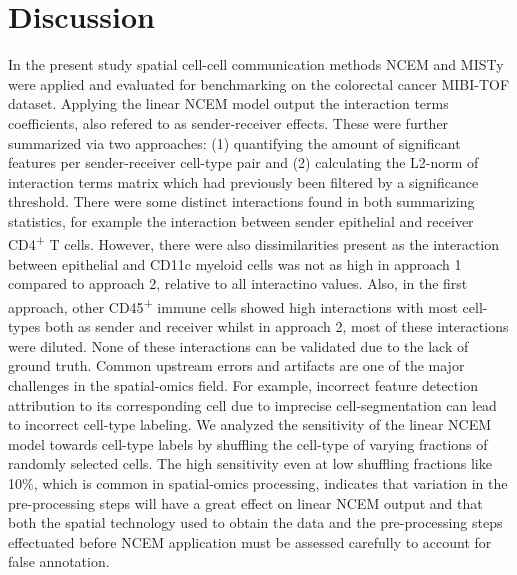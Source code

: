 \chapter{Discussion}
	


In the present study spatial cell-cell communication methods NCEM and MISTy were applied and evaluated for benchmarking on the \cite{Hartmann-2021} colorectal cancer MIBI-TOF dataset. Applying the linear NCEM model output the interaction terms coefficients, also refered to as sender-receiver effects. These were further summarized via two approaches: (1) quantifying the amount of significant features per sender-receiver cell-type pair and (2) calculating the L2-norm of interaction terms matrix which had previously been filtered by a significance threshold. There were some distinct interactions found in both summarizing statistics, for example the interaction between sender epithelial and receiver CD4\textsuperscript{+} T cells. However, there were also dissimilarities present as the interaction between epithelial and CD11c myeloid cells was not as high in approach 1 compared to approach 2, relative to all interactino values. Also, in the first approach, other CD45\textsuperscript{+} immune cells showed high interactions with most cell-types both as sender and receiver whilst in approach 2, most of these interactions were diluted. None of these interactions can be validated due to the lack of ground truth. Common upstream errors and artifacts are one of the major challenges in the spatial-omics field. For example, incorrect feature detection attribution to its corresponding cell due to imprecise cell-segmentation can lead to incorrect cell-type labeling. We analyzed the sensitivity of the linear NCEM model towards cell-type labels by shuffling the cell-type of varying fractions of randomly selected cells. The high sensitivity even at low shuffling fractions like 10\%, which is common in spatial-omics processing, indicates that variation in the pre-processing steps will have a great effect on linear NCEM output and that both the spatial technology used to obtain the data and the pre-processing steps effectuated before NCEM application must be assessed carefully to account for false annotation.

